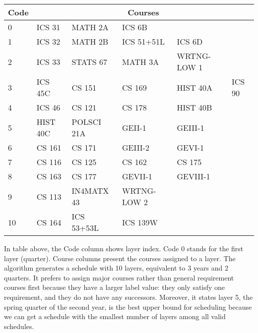 \documentclass[letterpaper,12pt]{article}
\theoremstyle{definition}
\begin{document}
\begin{center}
\begin{tabular}{|m{1cm}|m{2cm}|m{2cm}|m{2cm}|m{2cm}|m{2cm}|}
\hline
\textbf{Code} & \multicolumn{5}{c|}{\textbf{Courses}}                                                  \\ \hline
0            & ICS 31  & MATH 2A        & ICS 6B      &                 &            \\ \hline
1            & ICS 32  & MATH 2B        & ICS 51+51L      & ICS 6D      &            \\ \hline
2            & ICS 33  & STATS 67       & MATH 3A         & WRTNG-LOW 1 &            \\ \hline
3            & ICS 45C & CS 151    & CS 169     & HIST 40A     & ICS 90 \\ \hline
4            & ICS 46  & CS 121    & CS 178     & HIST 40B     &            \\ \hline
5            & HIST 40C & POLSCI 21A     & GEII-1          & GEIII-1         &            \\ \hline
6            & CS 161 & CS 171    & GEIII-2         & GEVI-1          &            \\ \hline
7            & CS 116 & CS 125    & CS 162     & CS 175     &            \\ \hline
8            & CS 163 & CS 177    & GEVII-1         & GEVIII-1        &            \\ \hline
9            & CS 113 & IN4MATX 43     & WRTNG-LOW 2 &                 &            \\ \hline
10           & CS 164 & ICS 53+53L & ICS 139W    &                 &            \\ \hline
\end{tabular}
\end{center}
In table above, the Code column shows layer index. Code $0$ stands for the first layer (quarter). Course columns present the courses assigned to a layer. The algorithm generates a schedule with 10 layers, equivalent to 3 years and 2 quarters. It prefers to assign major courses rather than general requirement courses first because they have a larger label value: they only satisfy one requirement, and they do not have any successors. Moreover, it states layer 5, the spring quarter of the second year, is the best upper bound for scheduling because we can get a schedule with the smallest number of layers among all valid schedules. 
\end{document}
